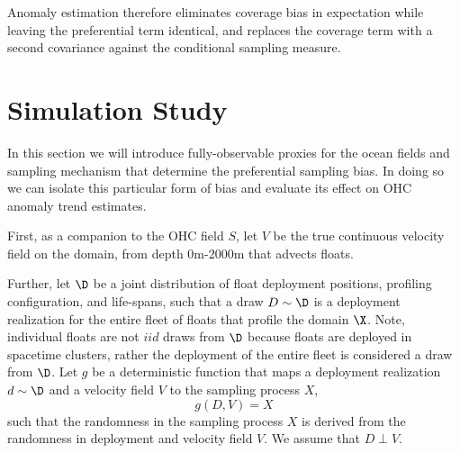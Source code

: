 Anomaly estimation therefore eliminates coverage bias in expectation while
leaving the preferential term identical, and replaces the coverage term with a
second covariance against the conditional sampling measure. 


\section{Simulation Study}

In this section we will introduce fully-observable proxies for the ocean fields and sampling mechanism that determine the preferential sampling bias.
In doing so we can isolate this particular form of bias and evaluate its effect on OHC anomaly trend estimates.

First, as a companion to the OHC field $S$, let $V$ be the true continuous velocity field on the domain, from depth 0m-2000m that advects floats.


Further, let $\D$ be a joint distribution of float deployment positions, profiling configuration, and life-spans, such that a draw $D \sim \D$ is a deployment realization for the entire fleet of floats that profile the domain $\X$.
Note, individual floats are not $iid$ draws from $\D$ because floats are deployed in spacetime clusters, rather the deployment of the entire fleet is considered a draw from 
$\D$.
Let $g$ be a deterministic function that maps a deployment realization $d \sim \D$ and a velocity field $V$ to the sampling process $X$,
\begin{equation}
  g(D, V) = X
\end{equation}
such that the randomness in the sampling process $X$ is derived from the randomness in deployment and velocity field $V$. We assume that $D \perp V$.

